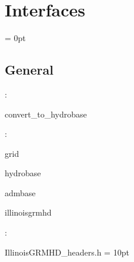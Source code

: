 
\section{Interfaces} 


\parskip = 0pt

\vspace{3mm} \subsection*{General}

: 

convert\_to\_hydrobase
\vspace{2mm}

: 

grid

hydrobase

admbase

illinoisgrmhd
\vspace{2mm}

\vspace{5mm}

: 

IllinoisGRMHD\_headers.h
\vspace{2mm}\parskip = 10pt 
